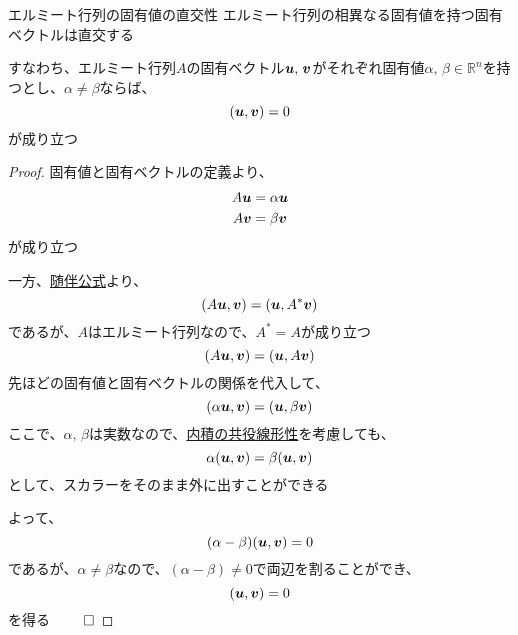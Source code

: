 \documentclass[../../../topic_linear-algebra]{subfiles}
\begin{document}
\begin{theorem}{エルミート行列の固有値の直交性}
  エルミート行列の相異なる固有値を持つ固有ベクトルは直交する

  すなわち、エルミート行列$A$の固有ベクトル$\vb*{u},\,\vb*{v}$がそれぞれ固有値$\alpha,\,\beta \in \mathbb{R}^n$を持つとし、$\alpha \neq \beta$ならば、
  \begin{equation*}
    (\vb*{u}, \vb*{v}) = 0
  \end{equation*}
  が成り立つ
\end{theorem}

\begin{proof}
  固有値と固有ベクトルの定義より、
  \begin{align*}
    A\vb*{u} & = \alpha \vb*{u} \\
    A\vb*{v} & = \beta \vb*{v}
  \end{align*}
  が成り立つ

  \br

  一方、\hyperref[thm:adjoint-identity]{随伴公式}より、
  \begin{equation*}
    (A\vb*{u}, \vb*{v}) = (\vb*{u}, A^*\vb*{v})
  \end{equation*}
  であるが、$A$はエルミート行列なので、$A^* = A$が成り立つ
  \begin{equation*}
    (A\vb*{u}, \vb*{v}) = (\vb*{u}, A\vb*{v})
  \end{equation*}
  先ほどの固有値と固有ベクトルの関係を代入して、
  \begin{equation*}
    (\alpha \vb*{u}, \vb*{v}) = (\vb*{u}, \beta \vb*{v})
  \end{equation*}
  ここで、$\alpha,\,\beta$は実数なので、\hyperref[thm:conjugate-linearity-of-inner-product]{内積の共役線形性}を考慮しても、
  \begin{equation*}
    \alpha (\vb*{u}, \vb*{v}) = \beta (\vb*{u}, \vb*{v})
  \end{equation*}
  として、スカラーをそのまま外に出すことができる

  \br

  よって、
  \begin{equation*}
    (\alpha - \beta)(\vb*{u}, \vb*{v}) = 0
  \end{equation*}
  であるが、$\alpha \neq \beta$なので、$(\alpha - \beta) \neq 0$で両辺を割ることができ、
  \begin{equation*}
    (\vb*{u}, \vb*{v}) = 0
  \end{equation*}
  を得る $\qed$
\end{proof}
\end{document}

